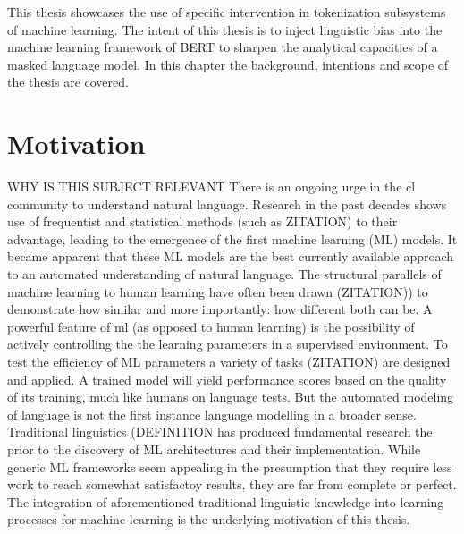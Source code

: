 
This thesis showcases the use of specific intervention in tokenization subsystems of machine learning.
The intent of this thesis is to inject linguistic bias into the machine learning framework of BERT to sharpen the analytical capacities of a masked language model.
In this chapter the background, intentions and scope of the thesis are covered.


\section{Motivation}
\label{sec:motivation}
\uppercase{Why is this subject relevant}
There is an ongoing urge in the \acf{cl} community to understand natural language.
Research in the past decades shows use of frequentist and statistical methods (such as \uppercase{ZITATION}) to their advantage, leading to the emergence of the first machine learning (ML) models.
It became apparent that these ML models are the best currently available approach to an automated understanding of natural language.
The structural parallels of machine learning to human learning have often been drawn (\uppercase{zitation)}) to demonstrate how similar and more importantly: how different both can be.
A powerful feature of \ac{ml} (as opposed to human learning) is the possibility of actively controlling the the learning parameters in a supervised environment.
To test the efficiency of \uppercase{ML} parameters a variety of tasks (\uppercase{zitation}) are designed and applied.
A trained model will yield performance scores based on the quality of its training, much like humans on language tests.
But the automated modeling of language is not the first instance language modelling in a broader sense.
Traditional linguistics (\uppercase{definition} has produced fundamental research the prior to the discovery of \uppercase{ML} architectures and their implementation.
While generic ML frameworks seem appealing in the presumption that they require less work to reach somewhat satisfactoy results,
they are far from complete or perfect.
The integration of aforementioned traditional linguistic knowledge into learning processes for machine learning is the underlying motivation of this thesis.

